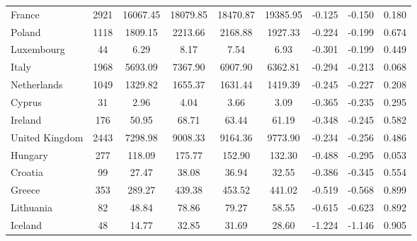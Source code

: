 \begin{table}[htbp]
\begin{tabular}{lcccccccc}
France & 2921 & 16067.45 & 18079.85 & 18470.87 & 19385.95 & -0.125 & -0.150 & 0.180 \\
Poland & 1118 & 1809.15 & 2213.66 & 2168.88 & 1927.33 & -0.224 & -0.199 & 0.674 \\
Luxembourg & 44 & 6.29 & 8.17 & 7.54 & 6.93 & -0.301 & -0.199 & 0.449 \\
Italy & 1968 & 5693.09 & 7367.90 & 6907.90 & 6362.81 & -0.294 & -0.213 & 0.068 \\
Netherlands & 1049 & 1329.82 & 1655.37 & 1631.44 & 1419.39 & -0.245 & -0.227 & 0.208 \\
Cyprus & 31 & 2.96 & 4.04 & 3.66 & 3.09 & -0.365 & -0.235 & 0.295 \\
Ireland & 176 & 50.95 & 68.71 & 63.44 & 61.19 & -0.348 & -0.245 & 0.582 \\
United Kingdom & 2443 & 7298.98 & 9008.33 & 9164.36 & 9773.90 & -0.234 & -0.256 & 0.486 \\
Hungary & 277 & 118.09 & 175.77 & 152.90 & 132.30 & -0.488 & -0.295 & 0.053 \\
Croatia & 99 & 27.47 & 38.08 & 36.94 & 32.55 & -0.386 & -0.345 & 0.554 \\
Greece & 353 & 289.27 & 439.38 & 453.52 & 441.02 & -0.519 & -0.568 & 0.899 \\
Lithuania & 82 & 48.84 & 78.86 & 79.27 & 58.55 & -0.615 & -0.623 & 0.892 \\
Iceland & 48 & 14.77 & 32.85 & 31.69 & 28.60 & -1.224 & -1.146 & 0.905 \\
\bottomrule
\end{tabular}
\end{table}
